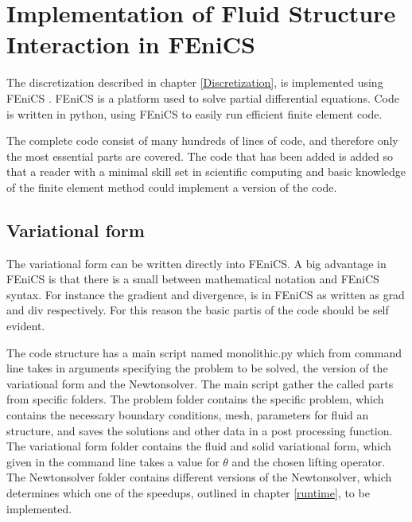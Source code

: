 \begin{comment}
\lstdefinelanguage{Python}{
 keywords={typeof, null, catch, switch, in, int, str, float, self},
 ndkeywords={boolean, throw, import},
 ndkeywords={return, class, if ,elif, endif, while, do, else, True, False , catch, def},
 ndkeywordstyle=\color{blue}\bfseries,
 identifierstyle=\color{black},
 sensitive=false,
 comment=[l]{\#},
 morecomment=[s]{/*}{*/},
 commentstyle=\color{purple}\ttfamily,
 stringstyle=\color{red}\ttfamily,
 backgroundcolor = \color{lightgray}
}
\end{comment}


\chapter{Implementation of Fluid Structure Interaction in FEniCS}
The discretization described in chapter \ref{Discretization}, is implemented using FEniCS \cite{FENICS}. FEniCS is a platform used to solve partial differential equations. Code is written in python, using FEniCS to easily run efficient finite element code. \newline

The complete code consist of many hundreds of lines of code, and therefore only the most essential parts are covered. The code that has been added is added so that a reader with a minimal skill set in scientific computing and basic knowledge of the finite element method could implement a version of the code.

\section{Variational form}

The variational form can be written directly into FEniCS. A big advantage in FEniCS is that there is a small  between mathematical notation and FEniCS syntax. For instance the gradient and divergence, is in FEniCS as written as grad and div respectively. For this reason the basic partis of the code should be self evident.

The code structure has a main script named monolithic.py which from command line takes in arguments specifying the problem to be solved, the version of the variational form and the Newtonsolver. The main script gather the called parts from specific folders. The problem folder contains the specific problem, which contains the necessary boundary conditions, mesh, parameters for fluid an structure, and saves the solutions and other data in a post processing function. The variational form folder contains the fluid and solid variational form, which given in the command line takes a value for $\theta$ and the chosen lifting operator. The Newtonsolver folder contains different versions of the Newtonsolver, which determines which one of the speedups, outlined in chapter \ref{runtime}, to be implemented.


